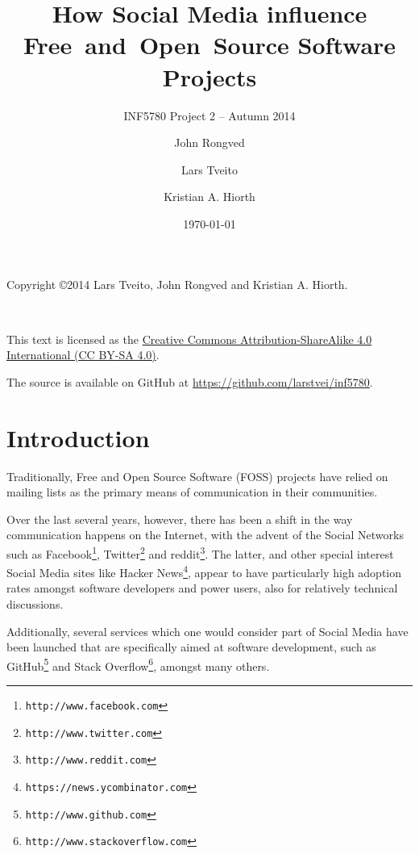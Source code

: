 \documentclass[a4paper,11pt]{article} %
\title{How Social Media influence \hbox{Free and Open Source} Software Projects}
\subtitle{INF5780 Project 2 -- Autumn 2014}
\date{\today}
\author{John Rongved \and Lars Tveito \and Kristian A. Hiorth}
\begin{document}
\ififorside{}

\tableofcontents{}

\vspace{\fill}

\begin{center}
Copyright \copyright 2014 Lars Tveito, John Rongved and Kristian
A. Hiorth.

\ccLogo ~~ \ccAttribution ~~ \ccShareAlike

This text is licensed as the \href{http://creativecommons.org/licenses/by-sa/4.0/}{Creative Commons
Attribution-ShareAlike 4.0 International (CC BY-SA 4.0)}.

The source is available on GitHub at
\url{https://github.com/larstvei/inf5780}.

\end{center}
\newpage

\section{Introduction}

Traditionally, Free and Open Source Software (FOSS) projects have
relied on mailing lists as the primary means of communication in
their communities. %

Over the last several years, however, there has been a shift in the way
communication happens on the Internet, with the advent of the Social
Networks such as Facebook\footnote{\texttt{http://www.facebook.com}}, Twitter\footnote{\texttt{http://www.twitter.com}} and reddit\footnote{\texttt{http://www.reddit.com}}.
The latter, and other special
interest Social Media sites like Hacker News\footnote{\texttt{https://news.ycombinator.com}}, appear to have particularly
high adoption rates amongst software developers and power users, also for
relatively technical discussions.

Additionally, several services which one would consider part of Social Media
have been launched that are specifically aimed at software development, such
as GitHub\footnote{\texttt{http://www.github.com}} and Stack Overflow\footnote{\texttt{http://www.stackoverflow.com}}, amongst many others.
\end{document}
